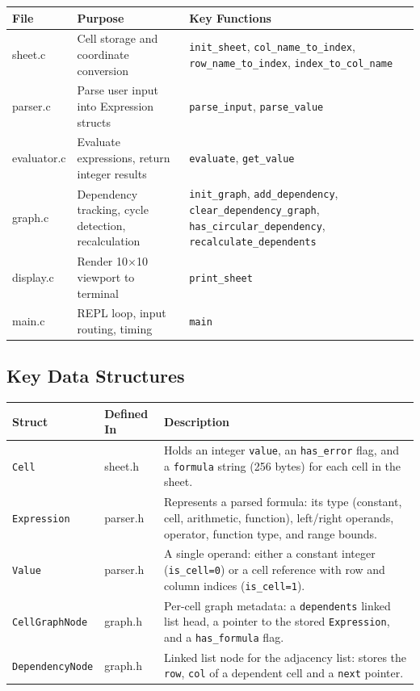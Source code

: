 \documentclass[11pt,a4paper]{article}
\begin{document}
\begin{table}[h]
\centering
\begin{tabular}{@{}lp{4.5cm}p{6cm}@{}}
\toprule
\textbf{File} & \textbf{Purpose} & \textbf{Key Functions} \\
\midrule
sheet.c & Cell storage and coordinate conversion & \texttt{init\_sheet}, \texttt{col\_name\_to\_index}, \texttt{row\_name\_to\_index}, \texttt{index\_to\_col\_name} \\
parser.c & Parse user input into Expression structs & \texttt{parse\_input}, \texttt{parse\_value} \\
evaluator.c & Evaluate expressions, return integer results & \texttt{evaluate}, \texttt{get\_value} \\
graph.c & Dependency tracking, cycle detection, recalculation & \texttt{init\_graph}, \texttt{add\_dependency}, \texttt{clear\_dependency\_graph}, \texttt{has\_circular\_dependency}, \texttt{recalculate\_dependents} \\
display.c & Render 10$\times$10 viewport to terminal & \texttt{print\_sheet} \\
main.c & REPL loop, input routing, timing & \texttt{main} \\
\bottomrule
\end{tabular}
\end{table}

\subsection{Key Data Structures}

\begin{table}[h]
\centering
\begin{tabular}{@{}lp{3cm}p{7cm}@{}}
\toprule
\textbf{Struct} & \textbf{Defined In} & \textbf{Description} \\
\midrule
\texttt{Cell} & sheet.h & Holds an integer \texttt{value}, an \texttt{has\_error} flag, and a \texttt{formula} string (256 bytes) for each cell in the sheet. \\
\texttt{Expression} & parser.h & Represents a parsed formula: its type (constant, cell, arithmetic, function), left/right operands, operator, function type, and range bounds. \\
\texttt{Value} & parser.h & A single operand: either a constant integer (\texttt{is\_cell=0}) or a cell reference with row and column indices (\texttt{is\_cell=1}). \\
\texttt{CellGraphNode} & graph.h & Per-cell graph metadata: a \texttt{dependents} linked list head, a pointer to the stored \texttt{Expression}, and a \texttt{has\_formula} flag. \\
\texttt{DependencyNode} & graph.h & Linked list node for the adjacency list: stores the \texttt{row}, \texttt{col} of a dependent cell and a \texttt{next} pointer. \\
\bottomrule
\end{tabular}
\end{table}
\end{document}
